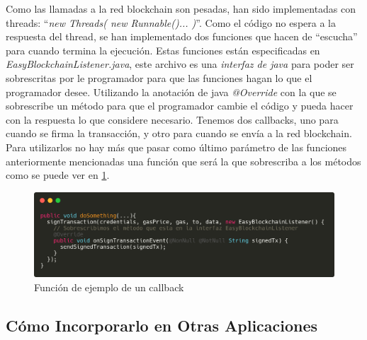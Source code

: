 Como las llamadas a la red blockchain son pesadas, han sido implementadas con threads: ``\textit{new Threads( new Runnable(){...} )}''. Como el código no espera a la respuesta del thread, se han implementado dos funciones que hacen de ``escucha'' para cuando termina la ejecución. Estas funciones están especificadas en \emph{EasyBlockchainListener.java}, este archivo es una \emph{interfaz de java} para poder ser sobrescritas por le programador para que las funciones hagan lo que el programador desee. Utilizando la anotación de java \textit{@Override} con la que se sobrescribe un método para que el programador cambie el código y pueda hacer con la respuesta lo que considere necesario. Tenemos dos callbacks, uno para cuando se firma la transacción, y otro para cuando se envía a la red blockchain. Para utilizarlos no hay más que pasar como último parámetro de las funciones anteriormente mencionadas una función que será la que sobrescriba a los métodos como se puede ver en \ref{fig:callback}.


\begin{figure}[h!]
  \centering
  \includegraphics[width=0.8\linewidth]{figs/Desarrollo/SDK/callback}
  \caption[Función de ejemplo de un callback]{Función de ejemplo de un callback}
  \label{fig:callback}
\end{figure}

\subsection{Cómo Incorporarlo en Otras Aplicaciones} \label{sec:Maven}

